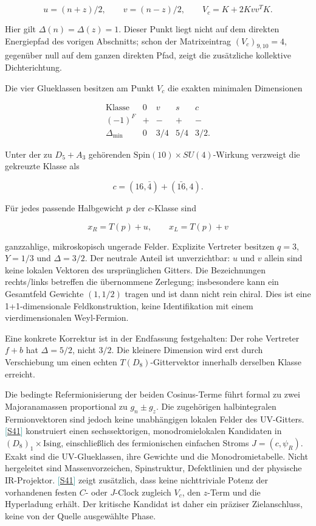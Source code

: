 \documentclass[11pt,a4paper,oneside,parskip=half,headings=normal,numbers=noenddot,bibliography=totoc]{scrreprt}
\newcommand{\src}[1]{\textcolor{teal}{\small[\hyperref[s:#1]{S#1}]}}
\begin{document}
\[
u=(n+z)/2,\qquad v=(n-z)/2,\qquad
V_c=K+2Kvv^TK.
\]

Hier gilt \(\Delta(n)=\Delta(z)=1\). Dieser Punkt liegt nicht auf dem direkten Energiepfad des vorigen Abschnitts; schon der Matrixeintrag \((V_c)_{9,10}=4\), gegenüber null auf dem ganzen direkten Pfad, zeigt die zusätzliche kollektive Dichterichtung.

Die vier Glueklassen besitzen am Punkt \(V_c\) die exakten minimalen Dimensionen

\[
\begin{array}{c|cccc}
\text{Klasse}&0&v&s&c\\ \hline
(-1)^F&+&-&+&-\\
\Delta_{\min}&0&3/4&5/4&3/2.
\end{array}
\]

Unter der zu \(D_5+A_3\) gehörenden \(\mathrm{Spin}(10)\times SU(4)\)-Wirkung verzweigt die gekreuzte Klasse als

\[
c=(16,\bar4)+(\bar{16},4).
\]

Für jedes passende Halbgewicht \(p\) der \(c\)-Klasse sind

\[
x_R=T(p)+u,\qquad x_L=T(p)+v
\]

ganzzahlige, mikroskopisch ungerade Felder. Explizite Vertreter besitzen \(q=3\), \(Y=1/3\) und \(\Delta=3/2\). Der neutrale Anteil ist unverzichtbar: \(u\) und \(v\) allein sind keine lokalen Vektoren des ursprünglichen Gitters. Die Bezeichnungen rechts/links betreffen die übernommene Zerlegung; insbesondere kann ein Gesamtfeld Gewichte \((1,1/2)\) tragen und ist dann nicht rein chiral. Dies ist eine 1+1-dimensionale Feldkonstruktion, keine Identifikation mit einem vierdimensionalen Weyl-Fermion.

Eine konkrete Korrektur ist in der Endfassung festgehalten: Der rohe Vertreter \(f+b\) hat \(\Delta=5/2\), nicht \(3/2\). Die kleinere Dimension wird erst durch Verschiebung um einen echten \(T(D_8)\)-Gittervektor innerhalb derselben Klasse erreicht.

Die bedingte Refermionisierung der beiden Cosinus-Terme führt formal zu zwei Majoranamassen proportional zu \(g_n\pm g_z\). Die zugehörigen halbintegralen Fermionvektoren sind jedoch keine unabhängigen lokalen Felder des UV-Gitters. \src{41} konstruiert einen sechssektorigen, monodromielokalen Kandidaten in \((D_8)_1\times\mathrm{Ising}\), einschließlich des fermionischen einfachen Stroms \(J=(c,\psi_R)\). Exakt sind die UV-Glueklassen, ihre Gewichte und die Monodromietabelle. Nicht hergeleitet sind Massenvorzeichen, Spinstruktur, Defektlinien und der physische IR-Projektor. \src{41} zeigt zusätzlich, dass keine nichttriviale Potenz der vorhandenen festen \(C\)- oder \(J\)-Clock zugleich \(V_c\), den \(z\)-Term und die Hyperladung erhält. Der kritische Kandidat ist daher ein präziser Zielanschluss, keine von der Quelle ausgewählte Phase.
\end{document}
